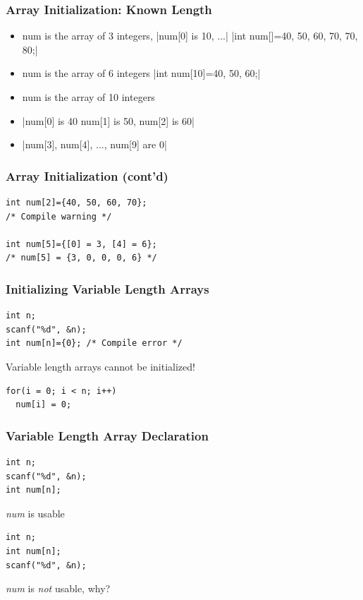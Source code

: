 \documentclass{../c-lecture}
\begin{document}
\begin{frame}[fragile]
  \frametitle{Array Initialization: Known Length}
  \begin{itemize}
    |int num[3]={10, 20, 60};|
    \item num is the array of 3 integers, |num[0] is 10, ...|
    |int num[]={40, 50, 60, 70, 70, 80};|
    \item num is the array of 6 integers
    |int num[10]={40, 50, 60};|
    \item num is the array of 10 integers
    \item {}|num[0] is 40 num[1] is 50, num[2] is 60|
    \item {}|num[3], num[4], ..., num[9] are 0|
  \end{itemize}
\end{frame}

\begin{frame}[fragile]
  \frametitle{Array Initialization (cont’d)}
  \begin{verbatim}
int num[2]={40, 50, 60, 70};
/* Compile warning */

int num[5]={[0] = 3, [4] = 6};
/* num[5] = {3, 0, 0, 0, 6} */
  \end{verbatim}
\end{frame}

\begin{frame}[fragile]
  \frametitle{Initializing Variable Length Arrays}
  \begin{verbatim}
int n;
scanf("%d", &n);
int num[n]={0}; /* Compile error */
  \end{verbatim}
  \begin{block}{}
    Variable length arrays cannot be initialized!
  \end{block}
  \begin{verbatim}
for(i = 0; i < n; i++)
  num[i] = 0;
  \end{verbatim}
\end{frame}

\begin{frame}[fragile]
  \frametitle{Variable Length Array Declaration}
  \begin{verbatim}
int n;
scanf("%d", &n);
int num[n];
  \end{verbatim}
  \textit{\color{Orange} num} is usable
  \begin{verbatim}
int n;
int num[n];
scanf("%d", &n);
  \end{verbatim}
  \begin{block}{}
    \textit{\color{Orange} num} is
    \textit{\color{RubineRed} not} usable, why?
  \end{block}
\end{frame}
\end{document}
